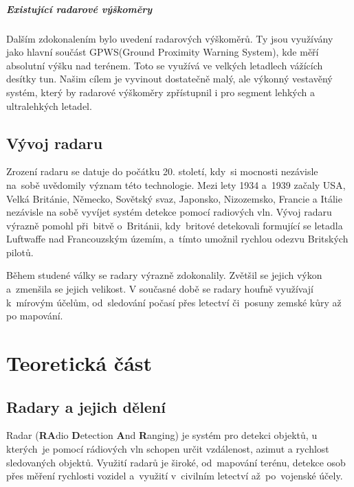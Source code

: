 		\paragraph{Existující radarové výškoměry}
		Dalším zdokonalením bylo uvedení radarových výškoměrů. Ty jsou využívány jako hlavní součást GPWS(Ground Proximity Warning System), kde měří absolutní výšku nad terénem. Toto se využívá ve velkých letadlech vážících desítky tun. Našim cílem je vyvinout dostatečně malý, ale výkonný vestavěný systém, který by radarové výškoměry zpřístupnil i pro segment lehkých a ultralehkých letadel.
	
	\section{Vývoj radaru}
		Zrození radaru se datuje do počátku 20. století, kdy~si mocnosti nezávisle na~sobě uvědomily význam této technologie. Mezi lety 1934 a~1939 začaly USA, Velká Británie, Německo, Sovětský svaz, Japonsko, Nizozemsko, Francie a Itálie nezávisle na sobě vyvíjet systém detekce pomocí radiových vln.\cite{history::radar} Vývoj radaru výrazně pomohl při~bitvě o~Británii, kdy~britové detekovali formující se letadla Luftwaffe nad Francouzským územím, a~tímto umožnil rychlou odezvu Britských pilotů.\par
			
		Během studené války se radary výrazně zdokonalily. Zvětšil se jejich výkon a~zmenšila se jejich velikost. V současné době se radary houfně využívají k~mírovým účelům, od~sledování počasí přes letectví či~posuny zemské kůry až po mapování.
		
\chapter{Teoretická část}
	
	\section{Radary a jejich dělení}\label{uvod::radary}
		Radar (\textbf{RA}dio \textbf{D}etection \textbf{A}nd \textbf{R}anging) je systém pro detekci objektů, u kterých~je pomocí rádiových vln schopen určit vzdálenost, azimut a rychlost sledovaných objektů. Využití radarů je široké, od~mapování terénu, detekce osob přes měření rychlosti vozidel a~využití v~civilním letectví až~po~vojenské účely.	
			
